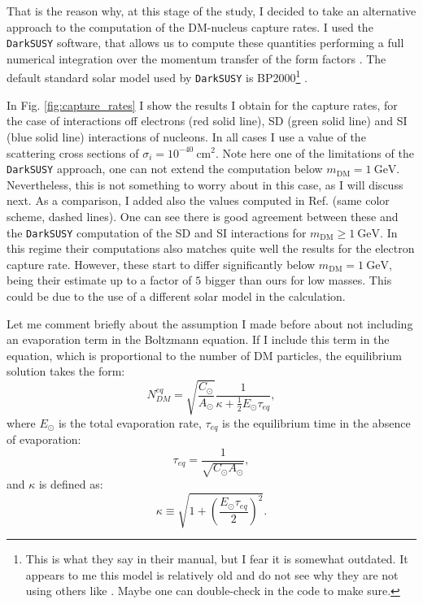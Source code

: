 That is the reason why, at this stage of the study, I decided to take an alternative approach to the computation of the DM-nucleus capture rates. I used the \texttt{DarkSUSY} software, that allows us to compute these quantities performing a full numerical integration over the momentum transfer of the form factors \cite{Bringmann2018}. The default standard solar model used by \texttt{DarkSUSY} is BP2000\footnote{This is what they say in their manual, but I fear it is somewhat outdated. It appears to me this model is relatively old and do not see why they are not using others like \cite{Bahcall2004}. Maybe one can double-check in the code to make sure.} \cite{Bahcall2000}.

In Fig. \ref{fig:capture_rates} I show the results I obtain for the capture rates, for the case of interactions off electrons (red solid line), SD (green solid line) and SI (blue solid line) interactions of nucleons. In all cases I use a value of the scattering cross sections of $\sigma_{i} = 10^{-40} \ \mathrm{cm}^{2}$. Note here one of the limitations of the \texttt{DarkSUSY} approach, one can not extend the computation below $m_{\mathrm{DM}} = 1 \ \mathrm{GeV}$. Nevertheless, this is not something to worry about in this case, as I will discuss next. As a comparison, I added also the values computed in Ref. \cite{Palomares2017} (same color scheme, dashed lines). One can see there is good agreement between these and the \texttt{DarkSUSY} computation of the SD and SI interactions for $m_{\mathrm{DM}} \geq 1 \ \mathrm{GeV}$. In this regime their computations also matches quite well the results for the electron capture rate. However, these start to differ significantly below $m_{\mathrm{DM}} = 1 \ \mathrm{GeV}$, being their estimate up to a factor of $5$ bigger than ours for low masses. This could be due to the use of a different solar model in the calculation.

Let me comment briefly about the assumption I made before about not including an evaporation term in the Boltzmann equation. If I include this term in the equation, which is proportional to the number of DM particles, the equilibrium solution takes the form:
\begin{equation}\label{2.17}
	N_{DM}^{eq} = \sqrt{\frac{C_{\odot}}{A_{\odot}}} \frac{1}{\kappa + \frac{1}{2} E_{\odot} \tau_{eq}},
\end{equation}
where $E_{\odot}$ is the total evaporation rate, $\tau_{eq}$ is the equilibrium time in the absence of evaporation:
\begin{equation}\label{2.18}
	\tau_{eq} = \frac{1}{\sqrt{C_{\odot} A_{\odot}}},
\end{equation}
and $\kappa$ is defined as:
\begin{equation}\label{2.19}
	\kappa \equiv \sqrt{1+\left(\frac{E_{\odot}\tau_{eq}}{2}\right)^{2}}.
\end{equation}

